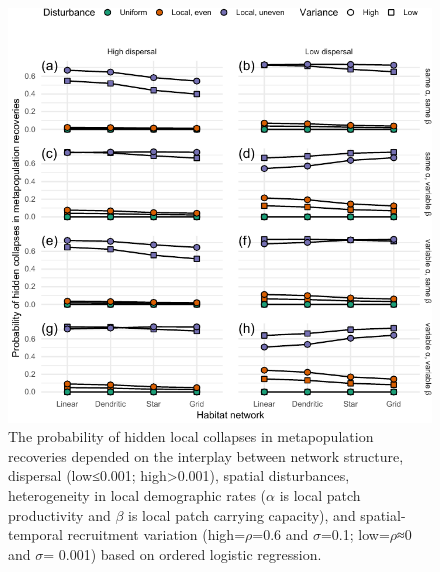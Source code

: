 \documentclass[
]{article}
\begin{document}
\begin{figure}[H]

{\centering \includegraphics{Managing_for_ecological_surprises_in_metapopulations_files/figure-latex/conditional probability for hidden collapses-1} 

}

\caption{The probability of hidden local collapses in metapopulation recoveries depended on the interplay between network structure, dispersal (low≤0.001; high>0.001), spatial disturbances, heterogeneity in local demographic rates ($\alpha$ is local patch productivity and $\beta$ is local patch carrying capacity), and spatial-temporal recruitment variation (high=$\rho$=0.6 and $\sigma$=0.1; low=$\rho$≈0 and $\sigma$= 0.001) based on ordered logistic regression.}\label{fig:conditional probability for hidden collapses}
\end{figure}
\end{document}
